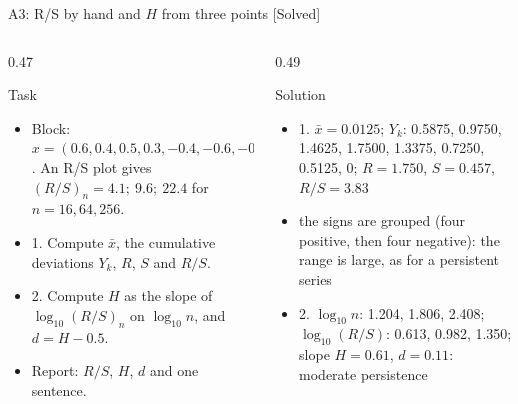 \begin{frame}{A3: R/S by hand and $H$ from three points [Solved]}
\itemsize{\scriptsize}
\begin{columns}[T]
\begin{column}{0.47\textwidth}
\begin{block}{Task}
\begin{itemize}
    \item Block: $x = (0.6, 0.4, 0.5, 0.3, -0.4, -0.6, -0.2, -0.5)$. An R/S plot gives $(R/S)_n = 4.1;\ 9.6;\ 22.4$ for $n = 16, 64, 256$.
    \item 1. Compute $\bar x$, the cumulative deviations $Y_k$, $R$, $S$ and $R/S$.
    \item 2. Compute $H$ as the slope of $\log_{10}(R/S)_n$ on $\log_{10}n$, and $d = H - 0.5$.
    \item Report: $R/S$, $H$, $d$ and one sentence.
\end{itemize}
\end{block}
\end{column}
\begin{column}{0.49\textwidth}
\begin{exampleblock}{Solution}
\begin{itemize}
    \item 1. $\bar x = 0.0125$; $Y_k$: 0.5875, 0.9750, 1.4625, 1.7500, 1.3375, 0.7250, 0.5125, 0; $R = 1.750$, $S = 0.457$, $R/S = 3.83$
    \item the signs are grouped (four positive, then four negative): the range is large, as for a persistent series
    \item 2. $\log_{10}n$: 1.204, 1.806, 2.408; $\log_{10}(R/S)$: 0.613, 0.982, 1.350; slope $H = 0.61$, $d = 0.11$: moderate persistence
\end{itemize}
\end{exampleblock}
\end{column}
\end{columns}
\end{frame}

